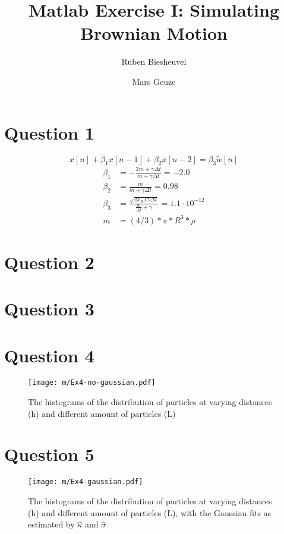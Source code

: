 \documentclass[12pt]{article}
\title{Matlab Exercise I: Simulating Brownian Motion}
\author[$\dagger$]{Ruben Biesheuvel}
\author[$\ddagger$]{Mars Geuze}
\affil[$\dagger$]{Student number 4076680}
\affil[$\ddagger$]{Student number 4109139}
\begin{document}
	\maketitle


\section*{Question 1}
\begin{equation}\label{difference}
x[n]+\beta_1x[n-1]+\beta_2x[n-2]=\beta_3\tilde{w}[n]
\end{equation}
\begin{align}
	\beta_1 &= -\frac{2m + \gamma\Delta t}{m+\gamma\Delta t} =-2.0\label{B1}\\
	\beta_2 &= \frac{m}{m+\gamma\Delta t} =0.98\label{B2}\\
	\beta_3 &= \frac{\sqrt{2k_BT\gamma\Delta t}}{\frac{m}{\Delta t}+\gamma}= 1.1\cdot10^{-12}\\
	m &= (4/3)*\pi*R^3*\rho
\end{align}

\clearpage\section*{Question 2}



\clearpage\section*{Question 3}



\clearpage\section*{Question 4}

\begin{figure}[h!]
\centering
\texttt{[image: m/Ex4-no-gaussian.pdf]} 
\caption{The histograms of the distribution of particles at varying distances (h) and different amount of particles (L)}
\label{fig:nogaussian}
\end{figure}

\clearpage\section*{Question 5}

\begin{figure}[h!]
\centering
\texttt{[image: m/Ex4-gaussian.pdf]} 
\caption{The histograms of the distribution of particles at varying distances (h) and different amount of particles (L), with the Gaussian fits as estimated by $\hat{\kappa}$ and $\hat{\sigma}$}
\label{fig:gaussian}
\end{figure}
\end{document}
